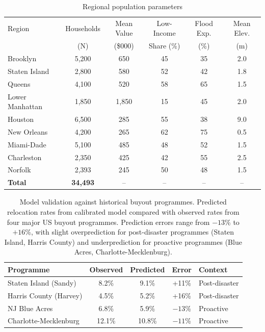 \documentclass[preprint,12pt,authoryear]{elsarticle}
\begin{document}
\begin{table}[htbp]
\centering
\caption{Regional population parameters}
\label{tab:parameters}
\begin{tabular}{lccccc}
\toprule
Region & Households & Mean Value & Low-Income & Flood Exp. & Mean Elev. \\
 & (N) & (\$000) & Share (\%) & (\%) & (m) \\
\midrule
Brooklyn & 5,200 & 650 & 45 & 35 & 2.0 \\
Staten Island & 2,800 & 580 & 52 & 42 & 1.8 \\
Queens & 4,100 & 520 & 58 & 65 & 1.5 \\
Lower Manhattan & 1,850 & 1,850 & 15 & 45 & 2.0 \\
Houston & 6,500 & 285 & 55 & 38 & 9.0 \\
New Orleans & 4,200 & 265 & 62 & 75 & 0.5 \\
Miami-Dade & 5,100 & 485 & 48 & 52 & 1.5 \\
Charleston & 2,350 & 425 & 42 & 55 & 2.5 \\
Norfolk & 2,393 & 245 & 50 & 48 & 1.5 \\
\midrule
\textbf{Total} & \textbf{34,493} & -- & -- & -- & -- \\
\bottomrule
\end{tabular}
\end{table}

\begin{table}[htbp]
\centering
\caption{Model validation against historical buyout programmes. Predicted relocation rates from calibrated model compared with observed rates from four major US buyout programmes. Prediction errors range from $-13$\% to $+16$\%, with slight overprediction for post-disaster programmes (Staten Island, Harris County) and underprediction for proactive programmes (Blue Acres, Charlotte-Mecklenburg).}
\label{tab:validation}
\begin{tabular}{lcccl}
\toprule
Programme & Observed & Predicted & Error & Context \\
\midrule
Staten Island (Sandy) & 8.2\% & 9.1\% & +11\% & Post-disaster \\
Harris County (Harvey) & 4.5\% & 5.2\% & +16\% & Post-disaster \\
NJ Blue Acres & 6.8\% & 5.9\% & $-13$\% & Proactive \\
Charlotte-Mecklenburg & 12.1\% & 10.8\% & $-11$\% & Proactive \\
\bottomrule
\end{tabular}
\end{table}
\end{document}
